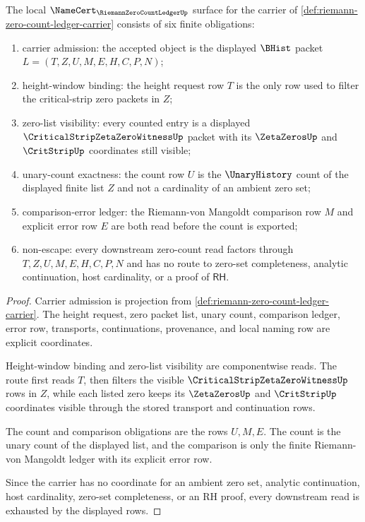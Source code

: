 \begin{theorem}
\label{thm:riemann-zero-count-ledger-namecert-obligations}
The local $\NameCert_{\RiemannZeroCountLedgerUp}$ surface for the carrier of \autoref{def:riemann-zero-count-ledger-carrier} consists of six finite obligations:
\begin{enumerate}
\item carrier admission: the accepted object is the displayed $\BHist$ packet $L=(T,Z,U,M,E,H,C,P,N)$;
\item height-window binding: the height request row $T$ is the only row used to filter the critical-strip zero packets in $Z$;
\item zero-list visibility: every counted entry is a displayed $\CriticalStripZetaZeroWitnessUp$ packet with its $\ZetaZerosUp$ and $\CritStripUp$ coordinates still visible;
\item unary-count exactness: the count row $U$ is the $\UnaryHistory$ count of the displayed finite list $Z$ and not a cardinality of an ambient zero set;
\item comparison-error ledger: the Riemann-von Mangoldt comparison row $M$ and explicit error row $E$ are both read before the count is exported;
\item non-escape: every downstream zero-count read factors through $T,Z,U,M,E,H,C,P,N$ and has no route to zero-set completeness, analytic continuation, host cardinality, or a proof of $\mathsf{RH}$.
\end{enumerate}
\end{theorem}
\begin{proof}
Carrier admission is projection from \autoref{def:riemann-zero-count-ledger-carrier}. The height request, zero packet list, unary count, comparison ledger, error row, transports, continuations, provenance, and local naming row are explicit coordinates.

Height-window binding and zero-list visibility are componentwise reads. The route first reads $T$, then filters the visible $\CriticalStripZetaZeroWitnessUp$ rows in $Z$, while each listed zero keeps its $\ZetaZerosUp$ and $\CritStripUp$ coordinates visible through the stored transport and continuation rows.

The count and comparison obligations are the rows $U,M,E$. The count is the unary count of the displayed list, and the comparison is only the finite Riemann-von Mangoldt ledger with its explicit error row.

Since the carrier has no coordinate for an ambient zero set, analytic continuation, host cardinality, zero-set completeness, or an RH proof, every downstream read is exhausted by the displayed rows.
\end{proof}

